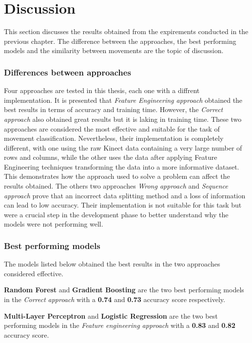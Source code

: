 \newpage
            
\section{Discussion}
        
        This section discusses the results obtained from the expirements conducted in the previous chapter. The difference between the approaches, the best performing models and the similarity between movements are the topic of discussion. 

        \subsubsection{Differences between approaches}
            Four approaches are tested in this thesis, each one with a diffrent implementation. It is presented that \textit{Feature Engineering approach} obtained the best results in terms of accuracy and training time. However, the \textit{Correct approach} also obtained great results but it is laking in training time. These two approaches are considered the most effective and suitable for the task of movement classification. Nevertheless, their implementation is completely different, with one using the raw Kinect data containing a very large number of rows and columns, while the other uses the data after applying Feature Engineering techniques transforming the data into a more informative dataset. This demonstrates how the approach used to solve a problem can affect the results obtained. 
            The others two approaches \textit{Wrong approach} and \textit{Sequence approach}
            prove that an incorrect data splitting method and a loss of information can lead to low accuracy. Their implementation is not suitable for this task but were a crucial step in the development phase to better understand why the models were not performing well. 

        \subsubsection{Best performing models}
            The models listed below obtained the best results in the two approaches considered effective. 

            \begin{boxlabel}
                \item \textbf{Random Forest} and \textbf{Gradient Boosting} are the two best performing models in the \textit{Correct approach} with a \textbf{0.74} and \textbf{0.73} accuracy score respectively.
                \item \textbf{Multi-Layer Perceptron} and \textbf{Logistic Regression} are the two best performing models in the \textit{Feature engineering approach} with a \textbf{0.83} and \textbf{0.82} accuracy score.
            \end{boxlabel}

